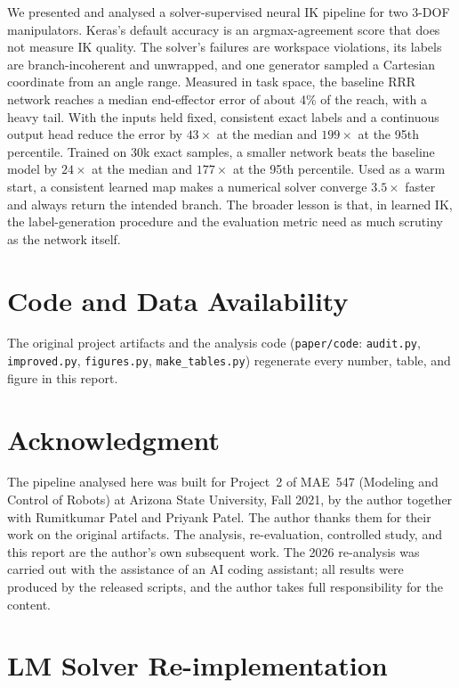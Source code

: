\documentclass[conference]{IEEEtran}
\newcommand{\code}[1]{\texttt{#1}}
\begin{document}
We presented and analysed a solver-supervised neural IK pipeline for two 3-DOF manipulators. Keras's default accuracy is an argmax-agreement score that does not measure IK quality. The solver's failures are workspace violations, its labels are branch-incoherent and unwrapped, and one generator sampled a Cartesian coordinate from an angle range. Measured in task space, the baseline RRR network reaches a median end-effector error of about 4\% of the reach, with a heavy tail. With the inputs held fixed, consistent exact labels and a continuous output head reduce the error by $43\times$ at the median and $199\times$ at the 95th percentile. Trained on 30k exact samples, a smaller network beats the baseline model by $24\times$ at the median and $177\times$ at the 95th percentile. Used as a warm start, a consistent learned map makes a numerical solver converge $3.5\times$ faster and always return the intended branch. The broader lesson is that, in learned IK, the label-generation procedure and the evaluation metric need as much scrutiny as the network itself.

\section*{Code and Data Availability}
The original project artifacts and the analysis code (\code{paper/code}: \code{audit.py}, \code{improved.py}, \code{figures.py}, \code{make\_tables.py}) regenerate every number, table, and figure in this report.

\section*{Acknowledgment}
The pipeline analysed here was built for Project~2 of MAE~547 (Modeling and Control of Robots) at Arizona State University, Fall 2021, by the author together with Rumitkumar Patel and Priyank Patel. The author thanks them for their work on the original artifacts. The analysis, re-evaluation, controlled study, and this report are the author's own subsequent work. The 2026 re-analysis was carried out with the assistance of an AI coding assistant; all results were produced by the released scripts, and the author takes full responsibility for the content.




\appendices




\section{LM Solver Re-implementation}
\label{app:lm}
\end{document}
